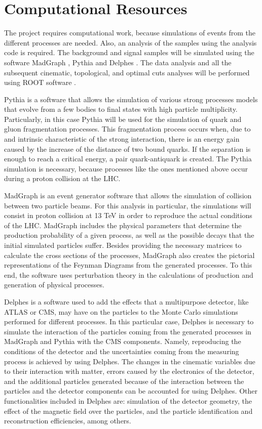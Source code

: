 \chapter{Computational Resources}

The project requires computational work, because simulations of events from the different processes are needed. Also, an analysis of the samples using the analysis code is required. The background and signal samples will be simulated using the software MadGraph \cite{MadGraph}, Pythia \cite{Pythia} and Delphes \cite{Delphes}. The data analysis and all the subsequent cinematic, topological, and optimal cuts analyses will be performed using ROOT software \cite{ROOT}.

Pythia is a software that allows the simulation of various strong processes models that evolve from a few bodies to final states with high particle multiplicity. Particularly, in this case Pythia will be used for the simulation of quark and gluon fragmentation processes. This fragmentation process occurs when, due to and intrinsic characteristic of the strong interaction, there is an energy gain caused by the increase of the distance of two bound quarks. If the separation is enough to reach a critical energy, a pair quark-antiquark is created. The Pythia simulation is necessary, because processes like the ones mentioned above occur during a proton collision at the LHC.

MadGraph is an event generator software that allows the simulation of collision between two particle beams. For this analysis in particular, the simulations will consist in proton collision at 13 TeV in order to reproduce the actual conditions of the LHC. MadGraph includes the physical parameters that determine the production probability of a given process, as well as the possible decays that the initial simulated particles suffer. Besides providing the necessary matrices to calculate the cross sections of the processes, MadGraph also creates the pictorial representations of the Feynman Diagrams from the generated processes. To this end, the software uses perturbation theory in the calculations of production and generation of physical processes.

Delphes is a software used to add the effects that a multipurpose detector, like ATLAS or CMS, may have on the particles to the Monte Carlo simulations performed for different processes. In this particular case, Delphes is necessary to simulate the interaction of the particles coming from the generated processes in MadGraph and Pythia with the CMS components. Namely, reproducing the conditions of the detector and the uncertainties coming from the measuring process is achieved by using Delphes. The changes in the cinematic variables due to their interaction with matter, errors caused by the electronics of the detector, and the additional particles generated because of the interaction between the particles and the detector components can be accounted for using Delphes. Other functionalities included in Delphes are: simulation of the detector geometry, the effect of the magnetic field over the particles, and the particle identification and reconstruction efficiencies, among others.

